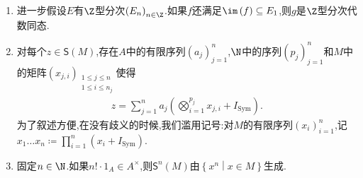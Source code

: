 \begin{remark}{}{}
	\begin{enumerate}
		\item 进一步假设$E$有$\Z$型分次$\left(E_{n}\right)_{n\in\Z}$.如果$f$还满足$\im\left(f\right)\subseteq E_{1}$,则$g$是$\Z$型分次代数同态.
		\item 对每个$z\in\mathsf{S}\left(M\right)$,存在$A$中的有限序列$\left(a_{j}\right)_{j=1}^{n}$,$\N$中的序列$\left(p_{j}\right)_{j=1}^{n}$和$M$中的矩阵$\left(x_{j,i}\right)_{\substack{1\leq j\leq n\\1\leq i\leq n_{j}}}$使得
		\begin{align*}
			z=\sum\limits_{j=1}^{n}a_{j}\left(\bigotimes\limits_{i=1}^{p_{j}}x_{j,i}+I_{\text{Sym}}\right).
		\end{align*}
		为了叙述方便,在没有歧义的时候,我们滥用记号:对$M$的有限序列$\left(x_{i}\right)_{i=1}^{n}$,记$x_{1}\ldots x_{n}\coloneq\prod\limits_{i=1}^{n}\left(x_{i}+I_{\text{Sym}}\right)$.
		\item 固定$n\in\N$.如果$n!\cdot 1_{A}\in A^{\times}$,则$\mathsf{S}^{n}\left(M\right)$由$\left\{x^{n}\middle|x\in M\right\}$生成.
	\end{enumerate}
\end{remark}
















